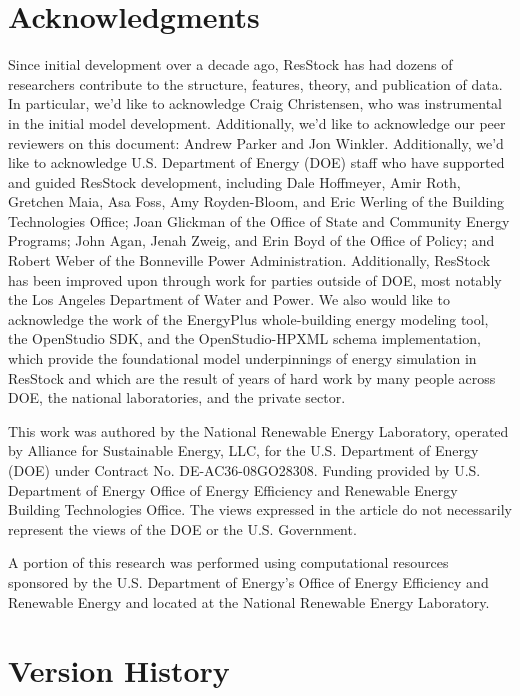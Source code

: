 \documentclass[]{nrel}
\begin{document}
\chapter{Acknowledgments}
Since initial development over a decade ago, ResStock has had dozens of researchers contribute to the structure, features, theory, and publication of data. In particular, we'd like to acknowledge Craig Christensen, who was instrumental in the initial model development. Additionally, we'd like to acknowledge our peer reviewers on this document: Andrew Parker and Jon Winkler. Additionally, we'd like to acknowledge U.S. Department of Energy (DOE) staff who have supported and guided ResStock development, including Dale Hoffmeyer, Amir Roth, Gretchen Maia, Asa Foss, Amy Royden-Bloom, and Eric Werling of the Building Technologies Office; Joan Glickman of the Office of State and Community Energy Programs; John Agan, Jenah Zweig, and Erin Boyd of the Office of Policy; and Robert Weber of the Bonneville Power Administration. Additionally, ResStock has been improved upon through work for parties outside of DOE, most notably the Los Angeles Department of Water and Power. We also would like to acknowledge the work of the EnergyPlus\textsuperscript{\textregistered} whole-building energy modeling tool, the OpenStudio\textsuperscript{\textregistered} SDK, and the OpenStudio-HPXML schema implementation, which provide the foundational model underpinnings of energy simulation in ResStock and which are the result of years of hard work by many people across DOE, the national laboratories, and the private sector.

This work was authored by the National Renewable Energy Laboratory, operated by Alliance for Sustainable Energy, LLC, for the U.S. Department of Energy (DOE) under Contract No. DE-AC36-08GO28308. Funding provided by U.S. Department of Energy Office of Energy Efficiency and Renewable Energy Building Technologies Office. The views expressed in the article do not necessarily represent the views of the DOE or the U.S. Government. 

A portion of this research was performed using computational resources sponsored by the U.S. Department of Energy's Office of Energy Efficiency and Renewable Energy and located at the National Renewable Energy Laboratory.

\chapter{Version History}
\end{document}
